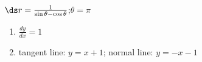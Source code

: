 {$\ds r=\frac1{\sin\theta-\cos\theta}$;\quad $\theta = \pi$}
{\begin{enumerate}
	\item $\frac{dy}{dx} = 1$
	\item	tangent line: $y=x+1$; normal line: $y=-x-1$
\end{enumerate}}
